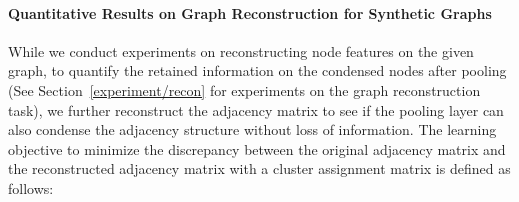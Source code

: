 \begin{table}[t]
\small
\centering
\caption{\small Quantitative results of the graph reconstruction task on reconstructing the node features and the adjacency matrix for synthetic graphs, with two different minimization objectives and error calculation metrics:  and . * indicates the model without using adjacency normalization.}
\label{app:adj:recon}
\end{table}

\paragraph{Quantitative Results on Graph Reconstruction for Synthetic Graphs}
While we conduct experiments on reconstructing node features on the given graph, to quantify the retained information on the condensed nodes after pooling (See Section~\ref{experiment/recon} for experiments on the graph reconstruction task), we further reconstruct the adjacency matrix to see if the pooling layer can also condense the adjacency structure without loss of information. The learning objective to minimize the discrepancy between the original adjacency matrix  and the reconstructed adjacency matrix  with a cluster assignment matrix  is defined as follows: 


